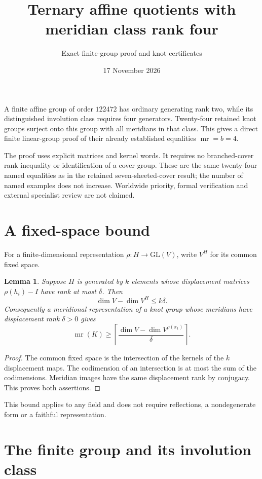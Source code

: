 \documentclass[11pt]{article}
\title{Ternary affine quotients with meridian class rank four}
\author{Exact finite-group proof and knot certificates}
\date{17 November 2026}
\newtheorem{lemma}[theorem]{Lemma}
\newcommand{\mr}{\operatorname{mr}}
\begin{document}
\maketitle

A finite affine group of order $122472$ has ordinary generating rank
two, while its distinguished involution class requires four generators.
Twenty-four retained knot groups surject onto this group with all
meridians in that class. This gives a direct finite linear-group proof
of their already established equalities $\mr=b=4$.

The proof uses explicit matrices and kernel words. It requires no
branched-cover rank inequality or identification of a cover group.
These are the same twenty-four named equalities as in the retained
seven-sheeted-cover result; the number of named examples does not
increase. Worldwide priority, formal verification and external
specialist review are not claimed.

\section{A fixed-space bound}

For a finite-dimensional representation $\rho:H\to\mathrm{GL}(V)$,
write $V^H$ for its common fixed space.

\begin{lemma}\label{lem:fixed}
Suppose $H$ is generated by $k$ elements whose displacement matrices
$\rho(h_i)-I$ have rank at most $\delta$. Then
\[
                       \dim V-\dim V^H\le k\delta.
\]
Consequently a meridional representation of a knot group whose
meridians have displacement rank $\delta>0$ gives
\[
              \mr(K)\ge
              \left\lceil\frac{\dim V-\dim V^{\rho(\pi_1)}}{\delta}
              \right\rceil.
\]
\end{lemma}
\begin{proof}
The common fixed space is the intersection of the kernels of the
$k$ displacement maps. The codimension of an intersection is at most
the sum of the codimensions. Meridian images have the same
displacement rank by conjugacy. This proves both assertions.
\end{proof}

This bound applies to any field and does not require reflections,
a nondegenerate form or a faithful representation.

\section{The finite group and its involution class}
\end{document}
